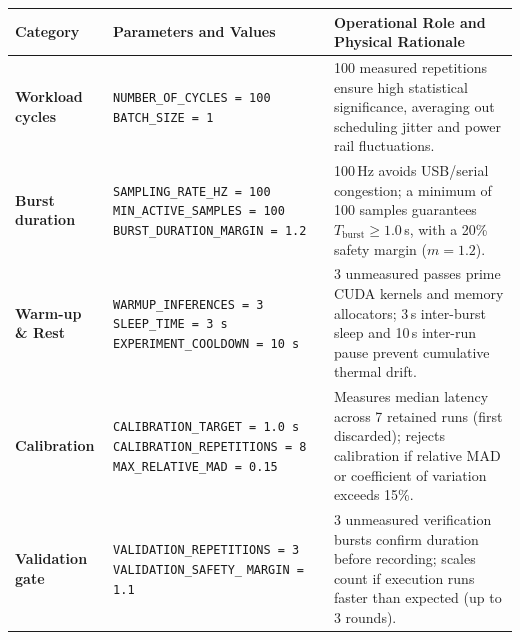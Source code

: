 \begin{table}
    \centering
    \footnotesize
    \setlength{\tabcolsep}{3pt}
    \renewcommand{\arraystretch}{1.15}
    \begin{tabular}{@{} p{2.5cm} p{4.3cm} p{6.5cm} @{}}
        \toprule
        \textbf{Category} & \textbf{Parameters and Values} & \textbf{Operational Role and Physical Rationale} \\
        \midrule
        \textbf{Workload cycles} & 
        \texttt{NUMBER\_OF\_CYCLES = 100} \newline
        \texttt{BATCH\_SIZE = 1} & 
        100 measured repetitions ensure high statistical significance, averaging out scheduling jitter and power rail fluctuations. \\
        \midrule
        \textbf{Burst duration} & 
        \texttt{SAMPLING\_RATE\_HZ = 100} \newline
        \texttt{MIN\_ACTIVE\_SAMPLES = 100} \newline
        \texttt{BURST\_DURATION\_MARGIN = 1.2} & 
        100\,Hz avoids USB/serial congestion; a minimum of 100 samples guarantees $T_{\text{burst}} \ge 1.0$\,s, with a 20\% safety margin ($m = 1.2$). \\
        \midrule
        \textbf{Warm-up \& Rest} & 
        \texttt{WARMUP\_INFERENCES = 3} \newline
        \texttt{SLEEP\_TIME = 3\,s} \newline
        \texttt{EXPERIMENT\_COOLDOWN = 10\,s} & 
        3 unmeasured passes prime CUDA kernels and memory allocators; 3\,s inter-burst sleep and 10\,s inter-run pause prevent cumulative thermal drift. \\
        \midrule
        \textbf{Calibration} & 
        \texttt{CALIBRATION\_TARGET = 1.0\,s} \newline
        \texttt{CALIBRATION\_REPETITIONS = 8} \newline
        \texttt{MAX\_RELATIVE\_MAD = 0.15} & 
        Measures median latency across 7 retained runs (first discarded); rejects calibration if relative MAD or coefficient of variation exceeds 15\%. \\
        \midrule
        \textbf{Validation gate} & 
        \texttt{VALIDATION\_REPETITIONS = 3} \newline
        \texttt{VALIDATION\_SAFETY\_} \newline
        \texttt{MARGIN = 1.1} & 
        3 unmeasured verification bursts confirm duration before recording; scales count if execution runs faster than expected (up to 3 rounds). \\

\end{tabular}
\end{table}
